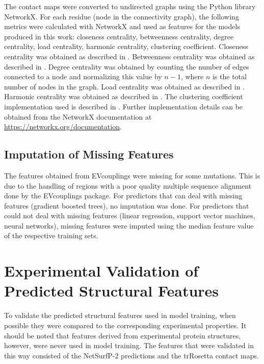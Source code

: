 The contact maps were converted to undirected graphs using the Python library NetworkX.
For each residue (node in the connectivity graph), the following metrics were calculated with NetworkX and used as features for the models produced in this work: closeness centrality, betweenness centrality, degree centrality, load centrality, harmonic centrality, clustering coefficient.
Closeness centrality was obtained as described in \textcite{Freeman1978}.
Betweenness centrality was obtained as described in \textcite{Brandes2001}.
Degree centrality was obtained by counting the number of edges connected to a node and normalizing this value by $n-1$, where $n$ is the total number of nodes in the graph.
Load centrality was obtained as described in \textcite{Newman2001}.
Harmonic centrality was obtained as described in \textcite{Boldi2014}.
The clustering coefficient implementation used is described in \textcite{Onnela2005}.
Further implementation details can be obtained from the NetworkX documentation at \url{https://networkx.org/documentation}.

\subsection{Imputation of Missing Features}\label{sec:mm_missing}
The features obtained from EVcouplings were missing for some mutations.
This is due to the handling of regions with a poor quality multiple sequence alignment done by the EVcouplings package.
For predictors that can deal with missing features (gradient boosted trees), no imputation was done.
For predictors that could not deal with missing features (linear regression, support vector machines, neural networks), missing features were imputed using the median feature value of the respective training sets.

\section{Experimental Validation of Predicted Structural Features}\label{sec:mm_exp_val}
To validate the predicted structural features used in model training, when possible they were compared to the corresponding experimental properties.
It should be noted that features derived from experimental protein structures, however, were never used in model training.
The features that were validated in this way consisted of the NetSurfP-2 predictions and the trRosetta contact maps.

